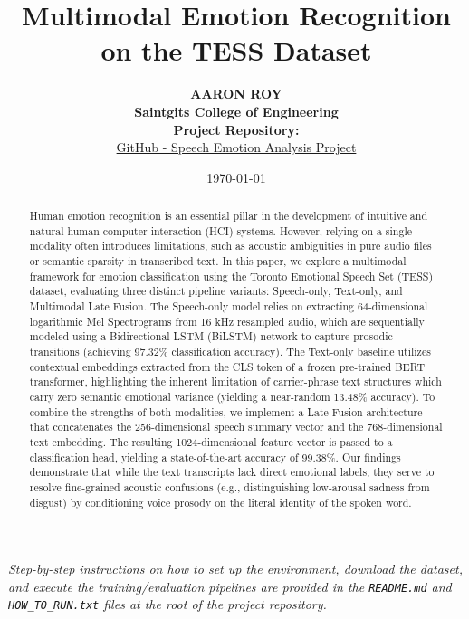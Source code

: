 \documentclass[11pt,journal,onecolumn]{IEEEtran}
\title{
\vspace{-1cm}
\textbf{Multimodal Emotion Recognition on the TESS Dataset}
}
\author{
\textbf{AARON ROY}\\
\vspace{0.5em}
\textbf{Saintgits College of Engineering}\\
\vspace{0.5em}
\textbf{Project Repository:}\\
\href{https://github.com/aaronroy123/speech_analysis_final}
{GitHub - Speech Emotion Analysis Project}
}
\date{\today}
\begin{document}

\maketitle

\vspace{-1em}

\begin{center}
\small\itshape
Step-by-step instructions on how to set up the environment, download the dataset, and execute the training/evaluation pipelines are provided in the \texttt{README.md} and \texttt{HOW\_TO\_RUN.txt} files at the root of the project repository.
\end{center}

\vspace{1em}

\begin{abstract}
\noindent
Human emotion recognition is an essential pillar in the development of intuitive and natural human-computer interaction (HCI) systems. However, relying on a single modality often introduces limitations, such as acoustic ambiguities in pure audio files or semantic sparsity in transcribed text. In this paper, we explore a multimodal framework for emotion classification using the Toronto Emotional Speech Set (TESS) dataset, evaluating three distinct pipeline variants: Speech-only, Text-only, and Multimodal Late Fusion. The Speech-only model relies on extracting 64-dimensional logarithmic Mel Spectrograms from 16 kHz resampled audio, which are sequentially modeled using a Bidirectional LSTM (BiLSTM) network to capture prosodic transitions (achieving 97.32\% classification accuracy). The Text-only baseline utilizes contextual embeddings extracted from the CLS token of a frozen pre-trained BERT transformer, highlighting the inherent limitation of carrier-phrase text structures which carry zero semantic emotional variance (yielding a near-random 13.48\% accuracy). To combine the strengths of both modalities, we implement a Late Fusion architecture that concatenates the 256-dimensional speech summary vector and the 768-dimensional text embedding. The resulting 1024-dimensional feature vector is passed to a classification head, yielding a state-of-the-art accuracy of 99.38\%. Our findings demonstrate that while the text transcripts lack direct emotional labels, they serve to resolve fine-grained acoustic confusions (e.g., distinguishing low-arousal sadness from disgust) by conditioning voice prosody on the literal identity of the spoken word.
\end{abstract}
\end{document}
